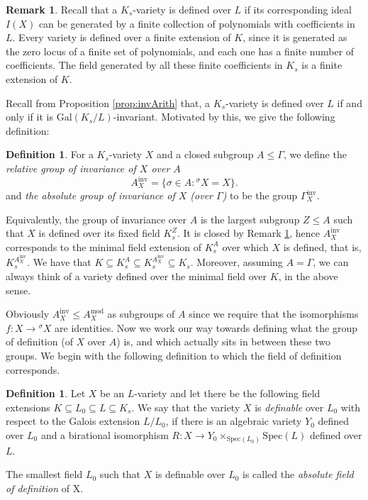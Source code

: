 \documentclass[10pt]{amsart}
\theoremstyle{definition}
\newtheorem{remark}[theorem]{Remark}
\newtheorem{definition}[theorem]{Definition}
\newcommand{\Spe}{ {\mathrm{Spec} } }
\newcommand{\Gal}{{ \mathrm{Gal}}}
\begin{document}
\begin{remark}
  \label{rem:finiteExtArith}
Recall that a $K_s$-variety is defined over $L$ if its corresponding ideal $I(X)$ can be generated by a finite collection of polynomials with coefficients in $L$. 
Every variety is defined over a finite extension of $K$, since it is generated as the zero locus of a finite set of polynomials, and each one has a finite number of coefficients. The field generated by all these finite coefficients in $K_s$ is a finite extension of $K$.
\end{remark}

Recall from Proposition \ref{prop:invArith} that, a $K_s$-variety is defined over $L$ if and only if it is $\Gal(K_s/L)$-invariant.
Motivated by this, we give the following  definition: 
\begin{definition}
  For a $K_s$-variety $X$ and a closed subgroup $A \leq \mathfrak{\Gamma}$, we define the {\em relative group of invariance of $X$ over $A$} 
\[
  A_X^{\mathrm{inv}}= \{\sigma \in A : {^\sigma \! X} =X\}.
\]
and {\em the absolute group of invariance of $X$ (over $\mathfrak{\Gamma}$)} to be the group $\mathfrak{\Gamma}_X^{\mathrm{inv}}$.
\end{definition}


Equivalently, the group of invariance over $A$ is the largest subgroup $Z \leq A$ such that $X$ is defined over its fixed field $K_s ^{Z}$. It is closed by Remark \ref{rem:finiteExtArith}, hence $A_X^{\mathrm{inv}}$ corresponds to the minimal field extension of $K_s^{A}$ over which $X$ is defined, that is, $K_s ^{A_X^{\mathrm{inv}}}$. We have that $K \subseteq K_s^A \subseteq K_s ^{A_X^{\mathrm{inv}}} \subseteq K_s$. Moreover, assuming $A = \mathfrak{\Gamma}$, we can always think of a variety defined over the minimal field over $K$, in the above sense.

Obviously $A_X^{\mathrm{inv}} \leq A_X^\mathrm{mod}$ as subgroups of $A$ since we require that the isomorphisms $f\colon X \to {^\sigma \!X}$ are identities. Now we work our way towards defining what the group of definition (of $X$ over $A $) is, and which actually sits in between these two groups. We begin with the following definition to which the field of definition corresponds.

\begin{definition}{\label{def:fieldofdef}}
Let $X$ be an $L$-variety and let there be the following field extensions $K \subseteq L_0 \subseteq L  \subseteq K_s$. 
We say that the variety $X$ is
{\em definable} over $L_0$ with respect to the Galois extension $L/L_0$, if there is an algebraic variety $Y_0$ defined over $L_0$ and a birational isomorphism $R\colon X \rightarrow Y_0 
\times_{\Spe (L_0)} \Spe (L)$ defined over $L$. 

The smallest field $L_0$ such that $X$ is definable over $L_0$ is called the {\em absolute field of definition} of X.
\end{definition}
\end{document}
